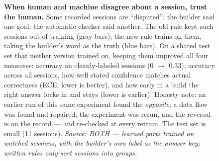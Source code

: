 \documentclass[11pt]{article}
\begin{document}
\begin{figure}[h]
\centering
{}
\caption{\textbf{When human and machine disagree about a session, trust the
human.} Some recorded sessions are ``disputed'': the builder said one goal,
the automatic checker said another. The old rule kept such sessions out of
training (gray bars); the new rule trains on them, taking the builder's word
as the truth (blue bars). On a shared test set that neither version trained
on, keeping them improved all four measures: accuracy on cleanly-labeled
sessions (0 $\to$ 0.33), accuracy across all sessions, how well stated
confidence matches actual correctness (ECE; lower is better), and how early
in a build the right answer locks in and stays (lower is earlier). Honesty
note: an earlier run of this same experiment found the \emph{opposite}; a
data flaw was found and repaired, the experiment was rerun, and the reversal
is on the record --- and re-checked at every retrain. The test set is small
(11 sessions).
\textit{Source: BOTH --- learned parts trained on watched sessions, with the
builder's own label as the answer key; written rules only sort sessions into
groups.}}
\end{figure}
\end{document}
